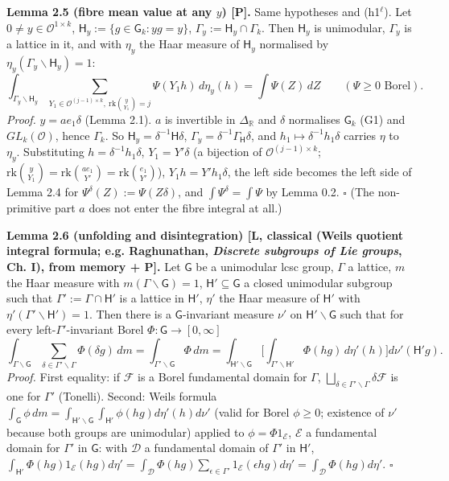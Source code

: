 \textbf{Lemma 2.5 (fibre mean value at any \(y\)) {[}P{]}.} Same hypotheses and (h1\(^\ell\)). Let \(0\ne y\in\mathcal O^{1\times k}\), \(\mathsf H_y:=\{g\in\mathsf G_k:yg=y\}\), \(\Gamma_y:=\mathsf H_y\cap\Gamma_k\). Then \(\mathsf H_y\) is unimodular, \(\Gamma_y\) is a lattice in it, and with \(\eta_y\) the Haar measure of \(\mathsf H_y\) normalised by \(\eta_y(\Gamma_y\backslash\mathsf H_y)=1\):
\[\int_{\Gamma_y\backslash\mathsf H_y}\sum_{Y_1\in\mathcal O^{(j-1)\times k},\ \mathrm{rk}\binom{y}{Y_1}=j}\Psi(Y_1h)\,d\eta_y(h)=\int\Psi(Z)\,dZ\qquad(\Psi\ge0\text{ Borel}).\]
\emph{Proof.} \(y=ae_1\delta\) (Lemma 2.1). \(a\) is invertible in \(\Delta_{\mathbb R}\) and \(\delta\) normalises \(\mathsf G_k\) (G1) and \(GL_k(\mathcal O)\), hence \(\Gamma_k\). So \(\mathsf H_y=\delta^{-1}\mathsf H\delta\), \(\Gamma_y=\delta^{-1}\Gamma_{\mathsf H}\delta\), and \(h_1\mapsto\delta^{-1}h_1\delta\) carries \(\eta\) to \(\eta_y\). Substituting \(h=\delta^{-1}h_1\delta\), \(Y_1=Y'\delta\) (a bijection of \(\mathcal O^{(j-1)\times k}\); \(\mathrm{rk}\binom{y}{Y_1}=\mathrm{rk}\binom{ae_1}{Y'}=\mathrm{rk}\binom{e_1}{Y'}\)), \(Y_1h=Y'h_1\delta\), the left side becomes the left side of Lemma 2.4 for \(\Psi^\delta(Z):=\Psi(Z\delta)\), and \(\int\Psi^\delta=\int\Psi\) by Lemma 0.2. \(\square\)
(The non-primitive part \(a\) does not enter the fibre integral at all.)

\textbf{Lemma 2.6 (unfolding and disintegration) {[}L, classical (Weil\textquotesingle s quotient integral formula; e.g. Raghunathan, \emph{Discrete subgroups of Lie groups}, Ch. I), from memory + P{]}.} Let \(\mathsf G\) be a unimodular lcsc group, \(\Gamma\) a lattice, \(m\) the Haar measure with \(m(\Gamma\backslash\mathsf G)=1\), \(\mathsf H'\subseteq\mathsf G\) a closed unimodular subgroup such that \(\Gamma':=\Gamma\cap\mathsf H'\) is a lattice in \(\mathsf H'\), \(\eta'\) the Haar measure of \(\mathsf H'\) with \(\eta'(\Gamma'\backslash\mathsf H')=1\). Then there is a \(\mathsf G\)-invariant measure \(\nu'\) on \(\mathsf H'\backslash\mathsf G\) such that for every left-\(\Gamma'\)-invariant Borel \(\Phi:\mathsf G\to[0,\infty]\)
\[\int_{\Gamma\backslash\mathsf G}\sum_{\delta\in\Gamma'\backslash\Gamma}\Phi(\delta g)\,dm=\int_{\Gamma'\backslash\mathsf G}\Phi\,dm=\int_{\mathsf H'\backslash\mathsf G}\Big[\int_{\Gamma'\backslash\mathsf H'}\Phi(hg)\,d\eta'(h)\Big]d\nu'(\mathsf H'g).\]
\emph{Proof.} First equality: if \(\mathcal F\) is a Borel fundamental domain for \(\Gamma\), \(\bigsqcup_{\delta\in\Gamma'\backslash\Gamma}\delta\mathcal F\) is one for \(\Gamma'\) (Tonelli). Second: Weil\textquotesingle s formula \(\int_{\mathsf G}\phi\,dm=\int_{\mathsf H'\backslash\mathsf G}\int_{\mathsf H'}\phi(hg)d\eta'(h)d\nu'\) (valid for Borel \(\phi\ge0\); existence of \(\nu'\) because both groups are unimodular) applied to \(\phi=\Phi1_{\mathcal E}\), \(\mathcal E\) a fundamental domain for \(\Gamma'\) in \(\mathsf G\): with \(\mathcal D\) a fundamental domain of \(\Gamma'\) in \(\mathsf H'\), \(\int_{\mathsf H'}\Phi(hg)1_{\mathcal E}(hg)d\eta'=\int_{\mathcal D}\Phi(hg)\sum_{\epsilon\in\Gamma'}1_{\mathcal E}(\epsilon hg)d\eta'=\int_{\mathcal D}\Phi(hg)d\eta'\). \(\square\)

